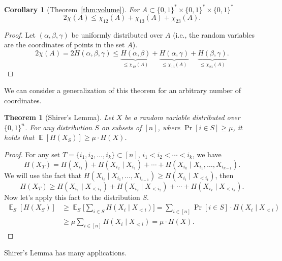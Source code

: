 \documentclass[12pt,sans]{article}
\newcommand{\bits}{\{0,1\}}
\newcommand{\bitstr}{\bits^*}
\newcommand{\seqn}[2]{{#1}_1,{#1}_2,\dotsc,{#1}_{#2}}
\DeclareMathOperator*{\E}{\mathbb{E}}
\theoremstyle{definition}
\theoremstyle{plain}
\newtheorem{theorem}{Theorem}[section]
\newtheorem{corollary}{Corollary}[section]
\theoremstyle{remark}
\begin{document}
\begin{corollary}[Theorem~\ref{thm:volume}]
For \(A \subset \bitstr \times \bitstr \times \bitstr\)
\[2\chi(A) \le \chi_{12}(A) + \chi_{13}(A) + \chi_{23}(A).\]
\end{corollary}
\begin{proof}
    Let \((\alpha, \beta, \gamma)\) be uniformly distributed over \(A\) (i.e., the random variables are the coordinates of points in the set \(A\)).
    \[
        2\chi(A) = 2H(\alpha, \beta, \gamma) \le
        \underbrace{H(\alpha, \beta)}_{\le \chi_{12}(A)} +
        \underbrace{H(\alpha, \gamma)}_{\le \chi_{13}(A)} +
        \underbrace{H(\beta, \gamma)}_{\le \chi_{23}(A)}.
    \]
\end{proof}
We can consider a generalization of this theorem for an arbitrary number of coordinates.
\begin{theorem}[Shirer's Lemma]
    Let \(X\) be a random variable distributed over \(\bits^n\).
    For any distribution \(S\) on subsets of \([n]\), where
    \(\Pr[i \in S] \ge \mu\), it holds that \(\E[H(X_S)] \ge \mu \cdot H(X)\).
\end{theorem}
\begin{proof}
    For any set \(T = \{\seqn{i}{k}\} \subset [n]\),
    \(i_1 < i_2 < \dotsb < i_k\), we have
    \[
        H(X_T) = H(X_{i_1}) + H(X_{i_2} \mid X_{i_1}) + \dotsb + H(X_{i_k} \mid X_{i_1}, \dotsc, X_{i_{k-1}}).
    \]
    We will use the fact that \(H(X_{i_t} \mid X_{i_1}, \dotsc, X_{i_{t-1}}) \ge H(X_{i_t} \mid X_{<i_t})\), then
    \[
        H(X_T)
        \ge H(X_{i_1} \mid X_{<i_1}) + H(X_{i_2} \mid X_{<i_2}) + \dotsb + H(X_{i_k} \mid X_{<i_k}).
    \]
    Now let’s apply this fact to the distribution \(S\).
    \begin{align*}
        \E_S[H(X_S)]
        &\ge \E_S\biggl[\sum_{i \in S} H(X_i \mid X_{<i})\biggr]
         = \sum_{i \in [n]} \Pr[i \in S] \cdot H(X_i \mid X_{<i})\\
        &\ge \mu \sum_{i \in [n]} H(X_i \mid X_{<i}) = \mu \cdot H(X).\tag*{\qedhere}
    \end{align*}
\end{proof}
Shirer's Lemma has many applications.
\end{document}
